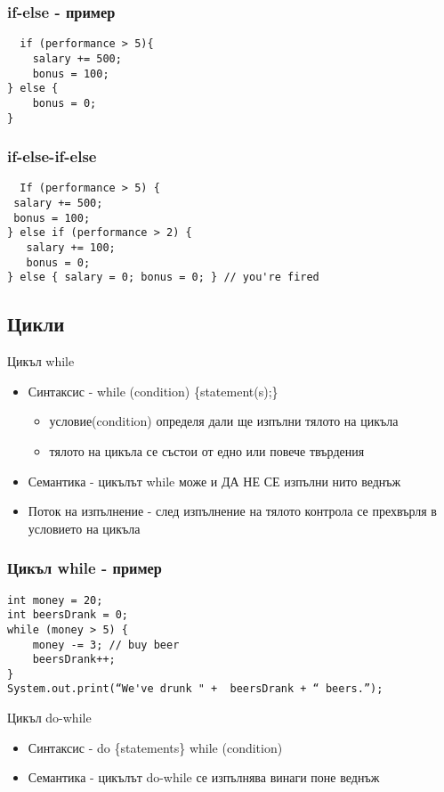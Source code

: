 \documentclass{beamer}
\begin{document}
\begin{frame}[fragile]
  \frametitle{if-else - пример}
\begin{lstlisting}
  if (performance > 5){
    salary += 500;
    bonus = 100;
} else {
    bonus = 0;
}
\end{lstlisting}
\end{frame}

\begin{frame}[fragile]
  \frametitle{if-else-if-else}
\begin{lstlisting}
  If (performance > 5) {
 salary += 500;
 bonus = 100;
} else if (performance > 2) {
   salary += 100;
   bonus = 0;
} else { salary = 0; bonus = 0; } // you're fired

\end{lstlisting}
\end{frame}

\subsection{Цикли}

\begin{frame}{Цикъл while}
  \begin{itemize}
  \item Синтаксис - while (condition) \{statement(s);\}
    \begin{itemize}
      \item условие(condition) определя дали ще изпълни тялото на цикъла
      \item тялото на цикъла се състои от едно или повече твърдения
    \end{itemize}

  \item Семантика - цикълът while може и ДА НЕ СЕ изпълни нито веднъж
  \item Поток на изпълнение - след изпълнение на тялото контрола се
    прехвърля в условието на цикъла
  \end{itemize}
\end{frame}

\begin{frame}[fragile]
  \frametitle{Цикъл while - пример}
\begin{lstlisting}
int money = 20;
int beersDrank = 0;
while (money > 5) {
    money -= 3; // buy beer
    beersDrank++;
}
System.out.print(“We've drunk " +  beersDrank + “ beers.”);
\end{lstlisting}
\end{frame}

\begin{frame}{Цикъл do-while}
  \begin{itemize}
  \item Синтаксис - do \{statements\} while (condition)
  \item Семантика - цикълът do-while се изпълнява винаги поне веднъж
  \end{itemize}
\end{frame}
\end{document}
